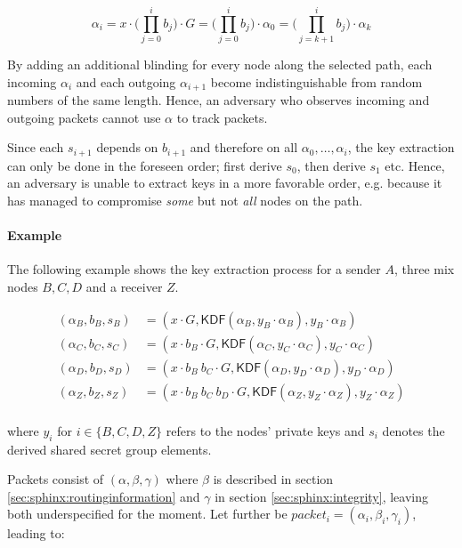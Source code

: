 $$ \alpha_i = x \cdot \biggl(\prod_{j=0}^{i} b_j \biggr) \cdot G = \biggl(\prod_{j=0}^{i} b_j \biggr) \cdot \alpha_0 = \biggl(\prod_{j=k+1}^{i} b_j \biggr) \cdot \alpha_k $$

By adding an additional blinding for every node along the selected path, each incoming $\alpha_i$ and each outgoing $\alpha_{i+1}$ become indistinguishable from random numbers of the same length. Hence, an adversary who observes incoming and outgoing packets cannot use $\alpha$ to track packets.

Since each $s_{i+1}$ depends on $b_{i+1}$ and therefore on all $\alpha_0, \dots , \alpha_i$, the key extraction can only be done in the foreseen order; first derive $s_0$, then derive $s_1$ etc. Hence, an adversary is unable to extract keys in a more favorable order, e.g. because it has managed to compromise \textit{some} but not \textit{all} nodes on the path.

\paragraph{Example}

The following example shows the key extraction process for a sender $A$, three mix nodes $B,C,D$ and a receiver $Z$.

\begin{align*}
    (\alpha_B,b_B,s_B) & = (x \cdot G,\textsf{KDF}(\alpha_B, y_B \cdot \alpha_B), y_B \cdot \alpha_B )                   \\
    (\alpha_C,b_C,s_C) & = (x \cdot b_B \cdot G,\textsf{KDF}(\alpha_C, y_C \cdot \alpha_C), y_C \cdot \alpha_C )             \\
    (\alpha_D,b_D,s_D) & = (x \cdot b_B \ b_C \cdot G,\textsf{KDF}(\alpha_D, y_D \cdot \alpha_D), y_D \cdot \alpha_D )       \\
    (\alpha_Z,b_Z,s_Z) & = (x \cdot b_B \ b_C \ b_D \cdot G,\textsf{KDF}(\alpha_Z, y_Z \cdot \alpha_Z), y_Z \cdot \alpha_Z ) \\
\end{align*}

where $y_i$ for $i \in \{ B,C,D,Z \}$ refers to the nodes' private keys and $s_i$ denotes the derived shared secret group elements.

Packets consist of $(\alpha, \beta, \gamma)$ where $\beta$ is described in section \ref{sec:sphinx:routinginformation} and $\gamma$ in section \ref{sec:sphinx:integrity}, leaving both underspecified for the moment. Let further be $packet_i = (\alpha_i, \beta_i, \gamma_i)$, leading to:

